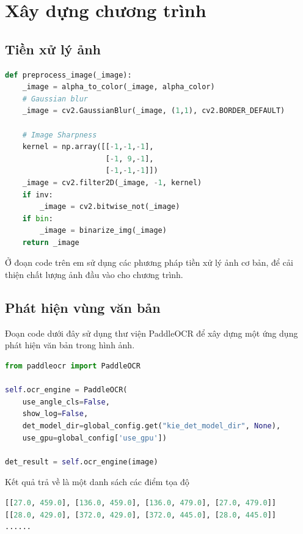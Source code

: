\newpage
\section{Xây dựng chương trình}
\subsection{Tiền xử lý ảnh}

\begin{lstlisting}[language=Python]
def preprocess_image(_image):
    _image = alpha_to_color(_image, alpha_color)
    # Gaussian blur
    _image = cv2.GaussianBlur(_image, (1,1), cv2.BORDER_DEFAULT)

    # Image Sharpness
    kernel = np.array([[-1,-1,-1], 
                       [-1, 9,-1], 
                       [-1,-1,-1]])
    _image = cv2.filter2D(_image, -1, kernel)
    if inv:
        _image = cv2.bitwise_not(_image)
    if bin:
        _image = binarize_img(_image)
    return _image  
\end{lstlisting}

Ở đoạn code trên em sử dụng các phương pháp tiền xử lý ảnh cơ bản, để cải thiện chất lượng ảnh đầu vào cho chương trình.
\subsection{Phát hiện vùng văn bản} \label{detsec}
Đoạn code dưới đây sử dụng thư viện PaddleOCR để xây dựng một ứng dụng phát hiện văn bản trong hình ảnh.
\begin{lstlisting}[language=Python]
from paddleocr import PaddleOCR

self.ocr_engine = PaddleOCR(
    use_angle_cls=False,
    show_log=False,
    det_model_dir=global_config.get("kie_det_model_dir", None),
    use_gpu=global_config['use_gpu'])

det_result = self.ocr_engine(image)
\end{lstlisting}
Kết quả trả về là một danh sách các điểm tọa độ
\begin{lstlisting}[language=Python]
[[27.0, 459.0], [136.0, 459.0], [136.0, 479.0], [27.0, 479.0]]
[[28.0, 429.0], [372.0, 429.0], [372.0, 445.0], [28.0, 445.0]]
......
\end{lstlisting}


